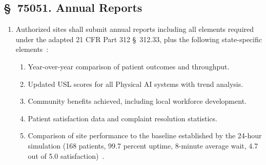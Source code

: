 \documentclass[11pt,letterpaper]{article}
\begin{document}
\subsection{\S~75051. Annual Reports}

\begin{enumerate}[label=(\alph*)]
\item Authorized sites shall submit annual reports including all elements
  required under the adapted 21 CFR Part 312 \S~312.33, plus the following
  state-specific elements~\cite{cfr312adapt}:
  \begin{enumerate}[label=(\arabic*)]
  \item Year-over-year comparison of patient outcomes and throughput.
  \item Updated USL scores for all Physical AI systems with trend analysis.
  \item Community benefits achieved, including local workforce development.
  \item Patient satisfaction data and complaint resolution statistics.
  \item Comparison of site performance to the baseline established by the
    24-hour simulation (168 patients, 99.7 percent uptime, 8-minute average
    wait, 4.7 out of 5.0 satisfaction)~\cite{newtrial2026}.
  \end{enumerate}
\end{enumerate}

\printbibliography[title={References}]
\end{document}
